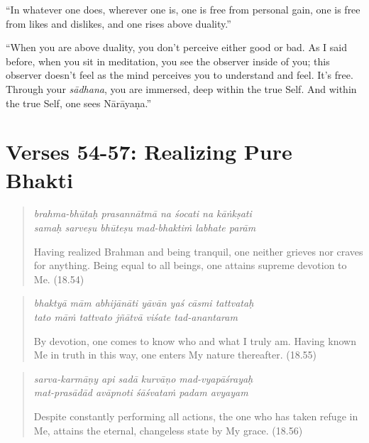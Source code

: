 \documentclass[12pt, twoside, openright]{memoir}
\begin{document}
\enquote{In whatever one does, wherever one is, one is free from personal gain, one is free from likes and dislikes, and one rises above duality.}

\enquote{When you are above duality, you don’t perceive either good or bad. As I said before, when you sit in meditation, you see the observer inside of you; this observer doesn’t feel as the mind perceives you to understand and feel. It’s free. Through your \textit{sādhana}, you are immersed, deep within the true Self. And within the true Self, one sees Nārāyaṇa.}

\section{Verses 54-57: Realizing Pure Bhakti}\label{sec-verses-54-57-realizing-pure-bhakti}


\par
\begin{verse}
\textit{brahma-bhūtaḥ prasannātmā na śocati na kāṅkṣati} \\
\textit{samaḥ sarveṣu bhūteṣu mad-bhaktiṁ labhate parām}

\noindent Having realized Brahman and being tranquil, one neither grieves nor craves for anything. Being equal to all beings, one attains supreme devotion to Me. (18.54)
\end{verse}
\par



\par
\begin{verse}
\textit{bhaktyā mām abhijānāti yāvān yaś cāsmi tattvataḥ} \\
\textit{tato māṁ tattvato jñātvā viśate tad-anantaram}

\noindent By devotion, one comes to know who and what I truly am. Having known Me in truth in this way, one enters My nature thereafter. (18.55)
\end{verse}
\par



\par
\begin{verse}
\textit{sarva-karmāṇy api sadā kurvāṇo mad-vyapāśrayaḥ} \\
\textit{mat-prasādād avāpnoti śāśvataṁ padam avyayam}

\noindent Despite constantly performing all actions, the one who has taken refuge in Me, attains the eternal, changeless state by My grace. (18.56)
\end{verse}
\par
\end{document}

